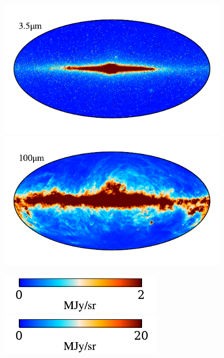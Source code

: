 \documentclass{aa}
\begin{document}
\begin{figure}
  
    \includegraphics[width=0.8\columnwidth]{figs/freq_maps/freq_03_c0001_000019.pdf}\includegraphics[width=0.8\columnwidth]{figs/freq_maps/freq_08_c0001_000019.pdf}
    \vspace*{-0.5cm}

    \includegraphics[width=0.4\columnwidth]{figs/freq_maps/freq_cbar_03_c0001_000019.pdf}\hspace{3.6cm}\includegraphics[width=0.4\columnwidth]{figs/freq_maps/freq_cbar_08_c0001_000019.pdf}


\end{figure}
\end{document}
